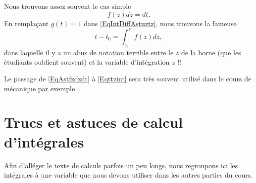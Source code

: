 Nous trouvons assez souvent le cas simple
\begin{equation}    \label{EqAstfzdzdt}
    f(z)dz=dt.
\end{equation}
En remplaçant $g(t)=1$ dans \eqref{EqIntDiffAstuztz}, nous trouvons la fameuse
\begin{equation}        \label{Eqttzint}
    t-t_0=\int_{z_0}^zf(z)dz,
\end{equation}
dans laquelle il y a un abus de notation terrible entre le $z$ de la borne (que les étudiants oublient souvent) et la variable d'intégration $z$ !!

Le passage de \eqref{EqAstfzdzdt} à \eqref{Eqttzint} sera très souvent utilisé dans le cours de mécanique par exemple.

\section{Trucs et astuces de calcul d'intégrales}

Afin d'alléger le texte de calculs parfois un peu longs, nous regroupons ici les intégrales à une variable que nous devons utiliser dans les autres parties du cours.


